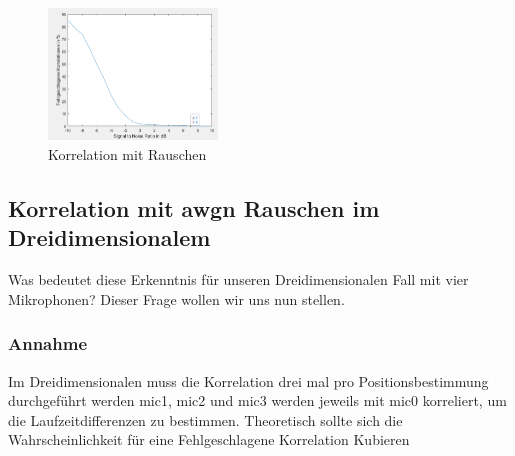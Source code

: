 \begin{figure}
\centering 
\includegraphics[width=0.4\textwidth]{Correlation mit Rauschen, (SNR) bei 4000 Segmentlaenge und 7500 corrBegin (in dB)}
\caption{Korrelation mit Rauschen} \label{fig:KorrelationAnalyseMitRauschen}
\end{figure}

\subsection{Korrelation mit awgn Rauschen im Dreidimensionalem}
Was bedeutet diese Erkenntnis für unseren Dreidimensionalen Fall mit vier Mikrophonen? Dieser Frage wollen wir uns nun stellen.

\subsubsection{Annahme}
Im Dreidimensionalen muss die Korrelation drei mal pro Positionsbestimmung durchgeführt werden mic1, mic2 und mic3 werden jeweils mit mic0 korreliert, um die Laufzeitdifferenzen zu bestimmen. Theoretisch sollte sich die Wahrscheinlichkeit für eine Fehlgeschlagene Korrelation Kubieren 

